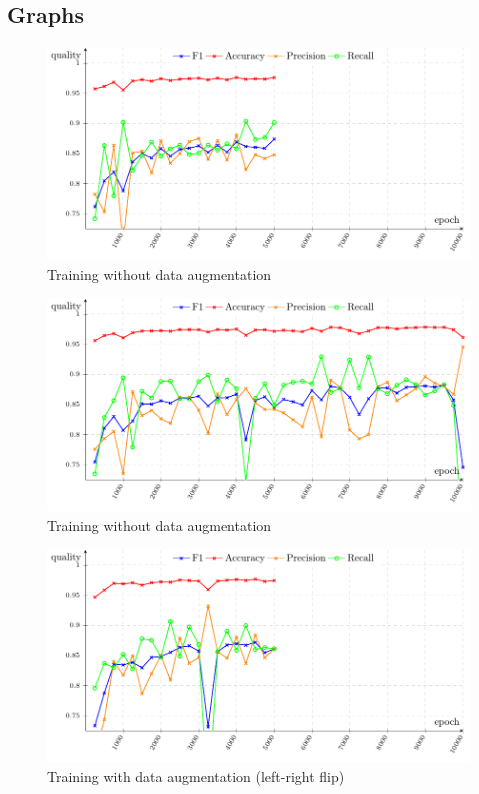 \begin{appendices}
\section{Graphs}
\begin{figure}[ht]
    \centering
    \includegraphics[width=\linewidth]{csv-line-plot/5000-no-augmentation.pdf}
    \caption{Training without data augmentation}
    \label{fig:graph-training-no-augmentation}
\end{figure}

\begin{figure}[ht]
    \centering
    \includegraphics[width=\linewidth]{csv-line-plot/10000-no-augmentation.pdf}
    \caption{Training without data augmentation}
    \label{fig:graph-training-no-augmentation}
\end{figure}

\begin{figure}[ht]
    \centering
    \includegraphics[width=\linewidth]{csv-line-plot/5000-lr-flip.pdf}
    \caption{Training with data augmentation (left-right flip)}
    \label{fig:graph-training-lr-flip}
\end{figure}


\end{appendices}

